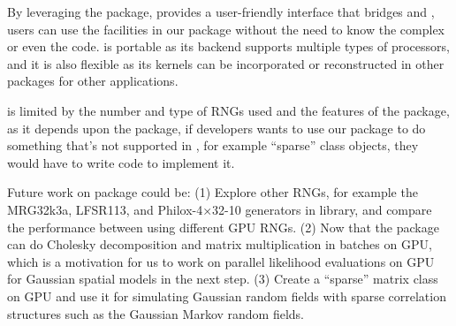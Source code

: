 \documentclass[article,nojss]{jss}\usepackage[]{graphicx}\usepackage[]{color}
\begin{document}
By leveraging the  package,  provides a user-friendly interface that bridges  and , users can use the facilities in our package without the need to know the complex  or even the  code.   is portable as its backend  supports multiple types of processors, and it is also flexible as its kernels can be incorporated or reconstructed in other  packages for other applications. 


 is limited by the number and type of  RNGs used and the features of the  package, as it depends upon the  package, if developers wants to use our package to do something that's not supported in , for example ``sparse'' class objects, they would have to write  code to implement it.

Future work on  package could be: (1) Explore other RNGs, for example the MRG32k3a, LFSR113, and Philox-4×32-10 generators in  library, and compare the  performance between using different GPU RNGs. (2) Now that the package can do Cholesky decomposition and matrix multiplication in batches on GPU, which is a motivation for us to work on parallel likelihood evaluations on GPU for Gaussian spatial models in the next step. (3) Create a ``sparse'' matrix class on GPU and use it for simulating Gaussian random fields with sparse correlation structures such as the Gaussian Markov random fields.










\newpage












\begin{appendix}

\end{appendix}
\end{document}
